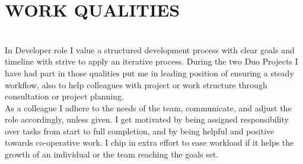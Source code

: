 \documentclass[10pt, a4paper]{article}
\begin{document}
\section*{WORK QUALITIES}
\texttt{}\\[-0.5cm]
In Developer role I value a structured development process with clear goals and timeline with strive to apply an iterative process.
During the two Duo Projects I have had part in those qualities put me in leading position of ensuring a steady workflow, also
to help colleagues with project or work structure through consultation or project planning.\\[0.2cm]
As a colleague I adhere to the needs of the team, communicate, and adjust the role accordingly, unless given. I get motivated by being assigned responsibility over tasks
from start to full completion, and by being helpful and positive towards co-operative work. I chip in extra effort to ease workload if it helps the growth of an individual or the team reaching the goals set.
\end{document}
